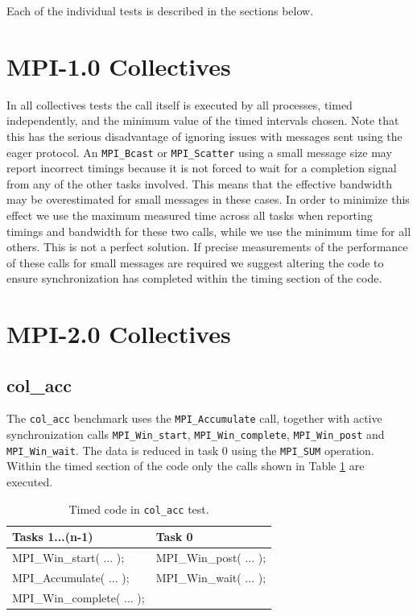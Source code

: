 \documentclass[10pt,a4paper]{report}
\begin{document}
Each of the individual tests is described in the sections below.

\section{MPI-1.0 Collectives}
\label{sec:collectives}

In all collectives tests the call itself is executed by all processes, timed independently, and the minimum value of the timed intervals chosen. Note that this has the serious disadvantage of ignoring issues with messages sent using the eager protocol. An \verb+MPI_Bcast+ or \verb+MPI_Scatter+ using a small message size may report incorrect timings because it is not forced to wait for a completion signal from any of the other tasks involved. This means that the effective bandwidth may be overestimated for small messages in these cases. In order to minimize this effect we use the maximum measured time across all tasks when reporting timings and bandwidth for these two calls, while we use the minimum time for all others. This is not a perfect solution. If precise measurements of the performance of these calls for small messages are required we suggest altering the code to ensure synchronization has completed within the timing section of the code. 

\section{MPI-2.0 Collectives}
\subsection{col\_acc}
The \verb+col_acc+ benchmark uses the \verb+MPI_Accumulate+ call, together with active synchronization calls \verb+MPI_Win_start+, \verb+MPI_Win_complete+, \verb+MPI_Win_post+ and \verb+MPI_Win_wait+. The data is reduced in task 0 using the \verb+MPI_SUM+ operation. Within the timed section of the code only the calls shown in Table \ref{tab:acc} are executed.

\begin{table}[ht]
\centering
\caption{Timed code in \texttt{col\_acc} test.}
\label{tab:acc}
\begin{tabular}{|l|l|}
\hline
\bf{Tasks 1...(n-1)}	   & \bf{Task 0}\\\hline
MPI\_Win\_start( ... );    & MPI\_Win\_post( ... );\\
MPI\_Accumulate( ... );    & MPI\_Win\_wait( ... );\\
MPI\_Win\_complete( ... ); & \\\hline
\end{tabular}
\end{table}
\end{document}
